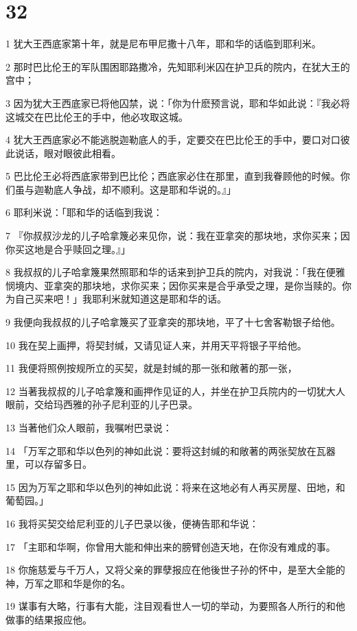 \chapter{32}

\par 1 犹大王西底家第十年，就是尼布甲尼撒十八年，耶和华的话临到耶利米。
\par 2 那时巴比伦王的军队围困耶路撒冷，先知耶利米囚在护卫兵的院内，在犹大王的宫中；
\par 3 因为犹大王西底家已将他囚禁，说：「你为什麽预言说，耶和华如此说：『我必将这城交在巴比伦王的手中，他必攻取这城。
\par 4 犹大王西底家必不能逃脱迦勒底人的手，定要交在巴比伦王的手中，要口对口彼此说话，眼对眼彼此相看。
\par 5 巴比伦王必将西底家带到巴比伦；西底家必住在那里，直到我眷顾他的时候。你们虽与迦勒底人争战，却不顺利。这是耶和华说的。』」
\par 6 耶利米说：「耶和华的话临到我说：
\par 7 『你叔叔沙龙的儿子哈拿篾必来见你，说：我在亚拿突的那块地，求你买来；因你买这地是合乎赎回之理。』」
\par 8 我叔叔的儿子哈拿篾果然照耶和华的话来到护卫兵的院内，对我说：「我在便雅悯境内、亚拿突的那块地，求你买来；因你买来是合乎承受之理，是你当赎的。你为自己买来吧！」我耶利米就知道这是耶和华的话。
\par 9 我便向我叔叔的儿子哈拿篾买了亚拿突的那块地，平了十七舍客勒银子给他。
\par 10 我在契上画押，将契封缄，又请见证人来，并用天平将银子平给他。
\par 11 我便将照例按规所立的买契，就是封缄的那一张和敞著的那一张，
\par 12 当著我叔叔的儿子哈拿篾和画押作见证的人，并坐在护卫兵院内的一切犹大人眼前，交给玛西雅的孙子尼利亚的儿子巴录。
\par 13 当著他们众人眼前，我嘱咐巴录说：
\par 14 「万军之耶和华以色列的神如此说：要将这封缄的和敞著的两张契放在瓦器里，可以存留多日。
\par 15 因为万军之耶和华以色列的神如此说：将来在这地必有人再买房屋、田地，和葡萄园。」
\par 16 我将买契交给尼利亚的儿子巴录以後，便祷告耶和华说：
\par 17 「主耶和华啊，你曾用大能和伸出来的膀臂创造天地，在你没有难成的事。
\par 18 你施慈爱与千万人，又将父亲的罪孽报应在他後世子孙的怀中，是至大全能的神，万军之耶和华是你的名。
\par 19 谋事有大略，行事有大能，注目观看世人一切的举动，为要照各人所行的和他做事的结果报应他。
